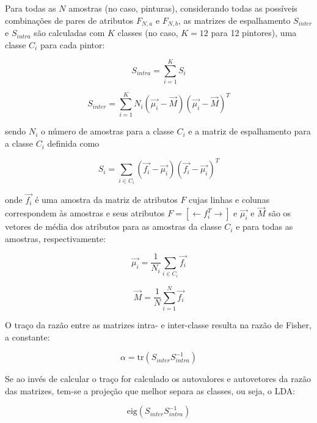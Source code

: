 Para todas as $N$ amostras (no caso, pinturas), considerando todas as possíveis
combinações de pares de atributos $F_{N, a}$ e $F_{N, b}$, as matrizes de
espalhamento $S_{inter}$ e $S_{intra}$ são calculadas com $K$ classes (no caso,
$K = 12$ para 12 pintores), uma classe $C_i$ para cada pintor:

\begin{equation}
S_{intra} = \sum_{i=1}^K S_i
\end{equation}

\begin{equation}
S_{inter} = \sum_{i=1}^K N_i(\vec{\mu_i} - \vec{M})(\vec{\mu_i} - \vec{M})^T
\end{equation}

\noindent sendo $N_i$ o número de amostras para a classe $C_i$ e a matriz de
espalhamento para a classe $C_i$ definida como

\begin{equation}
S_i = \sum_{i \in C_i} (\vec{f_i} - \vec{\mu_i})(\vec{f_i} - \vec{\mu_i})^T
\end{equation}

\noindent onde $\vec{f_i}$ é uma amostra da matriz de atributos $F$ cujas linhas
e colunas correspondem às amostras e seus atributos $F = \left[ \leftarrow
  f_i^T \rightarrow \right]$ e $\vec{\mu_i}$ e $\vec{M}$ são os vetores de média
dos atributos para as amostras da classe $C_i$ e para todas as amostras,
respectivamente:

\begin{equation} 
\vec{\mu_i} = \frac{1}{N_i} \sum_{i \in C_i} \vec{f_i}
\end{equation}

\begin{equation}
\vec{M} = \frac{1}{N} \sum_{i=1}^N \vec{f_i}
\end{equation}

O traço da razão entre as matrizes intra- e inter-classe resulta na razão de
Fisher, a constante:

\begin{equation} \label{eq:alpha}
\alpha = \mathrm{tr}(S_{inter} S_{intra}^{-1})
\end{equation}

Se ao invés de calcular o traço for calculado os autovalores e autovetores da
razão das matrizes, tem-se a projeção que melhor separa as classes, ou seja, o LDA:

\begin{equation} \label{eq:alpha}
\text{eig}(S_{inter} S_{intra}^{-1})
\end{equation}

